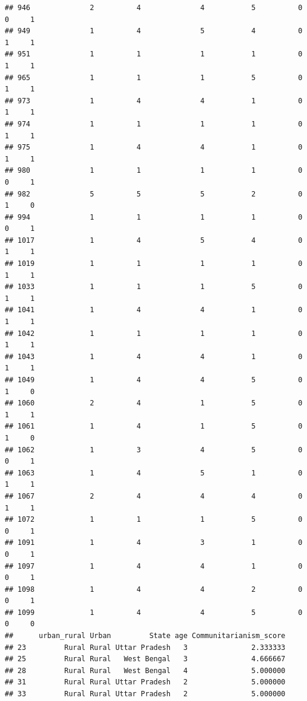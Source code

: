 \documentclass[
]{article}
\begin{document}
\begin{verbatim}
## 946              2          4              4           5          0    0     1
## 949              1          4              5           4          0    1     1
## 951              1          1              1           1          0    1     1
## 965              1          1              1           5          0    1     1
## 973              1          4              4           1          0    1     1
## 974              1          1              1           1          0    1     1
## 975              1          4              4           1          0    1     1
## 980              1          1              1           1          0    0     1
## 982              5          5              5           2          0    1     0
## 994              1          1              1           1          0    0     1
## 1017             1          4              5           4          0    1     1
## 1019             1          1              1           1          0    1     1
## 1033             1          1              1           5          0    1     1
## 1041             1          4              4           1          0    1     1
## 1042             1          1              1           1          0    1     1
## 1043             1          4              4           1          0    1     1
## 1049             1          4              4           5          0    1     0
## 1060             2          4              1           5          0    1     1
## 1061             1          4              1           5          0    1     0
## 1062             1          3              4           5          0    0     1
## 1063             1          4              5           1          0    1     1
## 1067             2          4              4           4          0    1     1
## 1072             1          1              1           5          0    0     1
## 1091             1          4              3           1          0    0     1
## 1097             1          4              4           1          0    0     1
## 1098             1          4              4           2          0    0     1
## 1099             1          4              4           5          0    0     0
##      urban_rural Urban         State age Communitarianism_score
## 23         Rural Rural Uttar Pradesh   3               2.333333
## 25         Rural Rural   West Bengal   3               4.666667
## 28         Rural Rural   West Bengal   4               5.000000
## 31         Rural Rural Uttar Pradesh   2               5.000000
## 33         Rural Rural Uttar Pradesh   2               5.000000

\end{verbatim}
\end{document}
